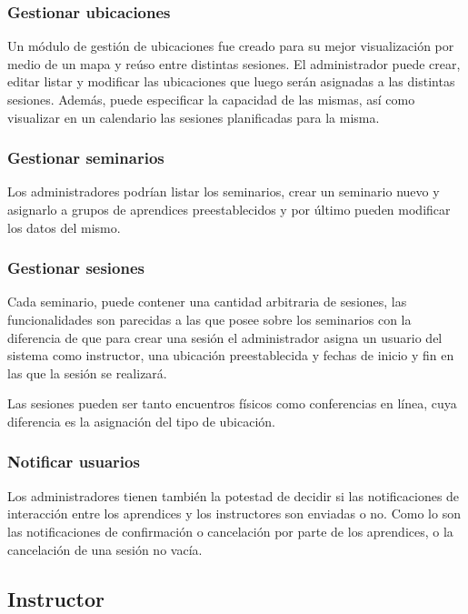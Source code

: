 			\subsubsection{Gestionar ubicaciones}

			Un módulo de gestión de ubicaciones fue creado para su mejor visualización por medio de un mapa y reúso entre distintas sesiones. El administrador puede crear, editar listar y modificar las ubicaciones que luego serán asignadas a las distintas sesiones. Además, puede especificar la capacidad de las mismas, así como visualizar en un calendario las sesiones planificadas para la misma.

			\subsubsection{Gestionar seminarios}

			Los administradores podrían listar los seminarios, crear un seminario nuevo y asignarlo a grupos de aprendices preestablecidos y por último pueden modificar los datos del mismo.


			\subsubsection{Gestionar sesiones}	
			
			Cada seminario, puede contener una cantidad arbitraria de sesiones, las funcionalidades son parecidas a las que posee sobre los seminarios con la diferencia de que para crear una sesión el administrador asigna un usuario del sistema como instructor, una ubicación preestablecida y fechas de inicio y fin en las que la sesión se realizará.

			Las sesiones pueden ser tanto encuentros físicos como conferencias en línea, cuya diferencia es la asignación del tipo de ubicación.

			\subsubsection{Notificar usuarios}

			Los administradores tienen también la potestad de decidir si las notificaciones de interacción entre los aprendices y los instructores son enviadas o no. Como lo son las notificaciones de confirmación o cancelación por parte de los aprendices, o la cancelación de una sesión no vacía.


		\subsection{Instructor} %
		\label{sub:instructor}
		
